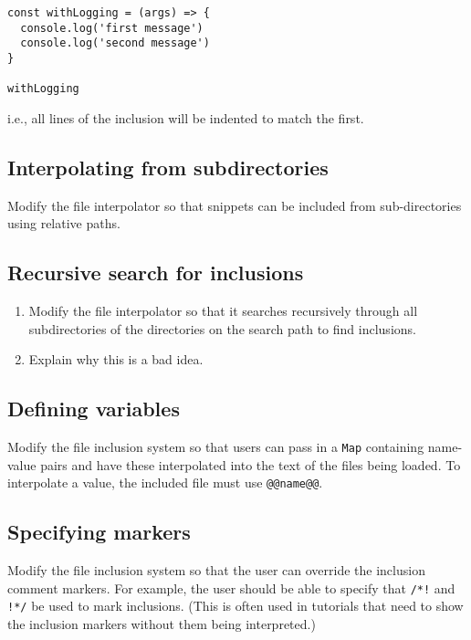 \documentclass[krantzl]{krantz}
\begin{document}
\begin{lstlisting}[frame=tblr]
const withLogging = (args) => {
  console.log('first message')
  console.log('second message')
}

withLogging
\end{lstlisting}


\noindent i.e., all lines of the inclusion will be indented to match the first.

\subsection*{Interpolating from subdirectories}


Modify the file interpolator so that snippets can be included from sub-directories using relative paths.

\subsection*{Recursive search for inclusions}

\begin{enumerate}

\item 

Modify the file interpolator so that it searches recursively
    through all subdirectories of the directories on the search path
    to find inclusions.



\item 

Explain why this is a bad idea.



\end{enumerate}

\subsection*{Defining variables}


Modify the file inclusion system so that users can pass in a \texttt{Map} containing name-value pairs
and have these interpolated into the text of the files being loaded.
To interpolate a value,
the included file must use \texttt{@@name@@}.

\subsection*{Specifying markers}


Modify the file inclusion system so that the user can override the inclusion comment markers.
For example, the user should be able to specify that \texttt{/*!} and \texttt{!*/} be used to mark inclusions.
(This is often used in tutorials that need to show the inclusion markers without them being interpreted.)
\end{document}
